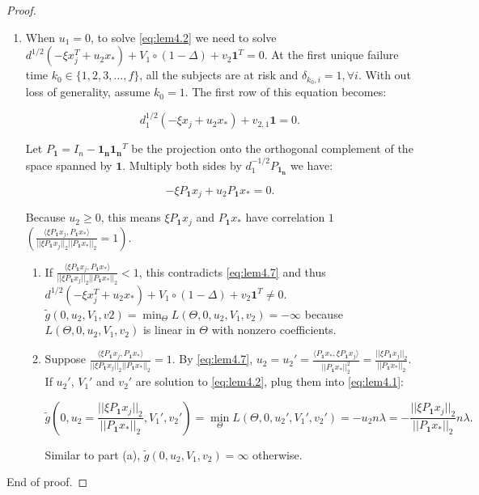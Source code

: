 \documentclass{article}
\begin{document}
\begin{proof}
\begin{enumerate}
\item When $u_1=0$, to solve \eqref{eq:lem4.2} we need to solve $d^{1/2}(-\xi x_j^T+u_2x_*)+V_1\circ(1-\Delta)+v_2\mathbf{1}^T=0.$ At the first unique failure time $k_0\in\{1,2,3,...,f\}$, all the subjects are at risk and $\delta_{k_0,i}=1,\forall i$. With out loss of generality, assume $k_0=1$. The first row of this equation becomes:

\begin{equation}
    d_1^{1/2}(-\xi x_j+u_2x_*) + v_{2,1}\mathbf{1}=0.
\end{equation}

Let $P_{\mathbf{1}}=I_n-\mathbf{1_n}\mathbf{1_n}^T$ be the projection onto the orthogonal complement of the space spanned by $\mathbf{1}$. Multiply both sides by $d^{-1/2}_1P_{\mathbf{1_n}}$ we have:

\begin{equation}
    \label{eq:lem4.7}
     -\xi P_{\mathbf{1}}x_j+u_2P_{\mathbf{1}}x_*=0.
\end{equation}

Because $u_2\geq 0$, this means $\xi P_{\mathbf{1}}x_j$ and $P_{\mathbf{1}}x_*$ have correlation $1$ $\left(\frac{\langle\xi P_{\mathbf{1}}x_j,P_{\mathbf{1}}x_*\rangle}{||\xi P_{\mathbf{1}}x_j||_2||P_{\mathbf{1}}x_*||_2}=1\right)$.
\begin{enumerate}
    \item If $\frac{\langle\xi P_{\mathbf{1}}x_j,P_{\mathbf{1}}x_*\rangle}{||\xi P_{\mathbf{1}}x_j||_2||P_{\mathbf{1}}x_*||_2}<1$, this contradicts \eqref{eq:lem4.7} and thus $d^{1/2}(-\xi x_j^T+u_2x_*)+V_1\circ(1-\Delta)+v_2\mathbf{1}^T\neq0.$
    $\tilde{g}(0,u_2,V_1,v2)=\min_\Theta L(\Theta,0,u_2,V_1,v_2)=-\infty$ because $L(\Theta,0,u_2,V_1,v_2)$ is linear in $\Theta$ with nonzero coefficients.
    \item Suppose $\frac{\langle\xi P_{\mathbf{1}}x_j,P_{\mathbf{1}}x_*\rangle}{||\xi P_{\mathbf{1}}x_j||_2||P_{\mathbf{1}}x_*||_2}=1$. By \eqref{eq:lem4.7}, $u_2=u_2'=\frac{\langle P_\mathbf{1}x_*,\xi P_\mathbf{1}x_j\rangle}{||P_\mathbf{1}x_*||_2^2}=\frac{||\xi P_\mathbf{1}x_j||_2}{||P_\mathbf{1}x_*||_2}$. If $u_2'$, $V_1'$ and $v_2'$ are solution to \eqref{eq:lem4.2}, plug them into \eqref{eq:lem4.1}:
    
    \begin{equation}
        \tilde{g}\left(0,u_2=\frac{||\xi P_\mathbf{1}x_j||_2}{||P_\mathbf{1}x_*||_2},V_1',v_2'\right)=\min_\Theta L(\Theta,0,u_2',V_1',v_2')=-u_2n\lambda=-\frac{||\xi P_\mathbf{1}x_j||_2}{||P_\mathbf{1}x_*||_2}n\lambda.
    \end{equation}
    
    Similar to part (a), $\tilde{g}(0,u_2,V_1,v_2)=\infty$ otherwise.
    
\end{enumerate}
\end{enumerate}

End of proof.

\end{proof}
\end{document}

